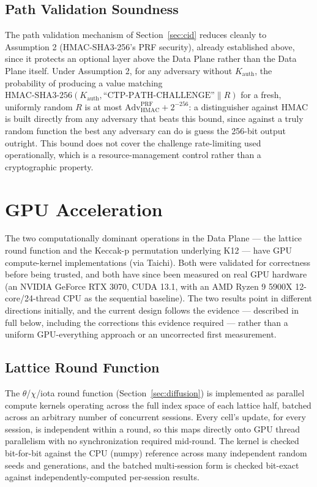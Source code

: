 \documentclass[twocolumn,10pt,journal,compsoc]{IEEEtran}
\begin{document}
\subsection{Path Validation Soundness}
The path validation mechanism of Section~\ref{sec:cid} reduces cleanly to Assumption 2 (HMAC-SHA3-256's PRF security), already established above, since it protects an optional layer above the Data Plane rather than the Data Plane itself. Under Assumption 2, for any adversary without $K_{\text{auth}}$, the probability of producing a value matching $\text{HMAC-SHA3-256}(K_{\text{auth}}, \text{``CTP-PATH-CHALLENGE''} \| R)$ for a fresh, uniformly random $R$ is at most $\text{Adv}^{\text{PRF}}_{\text{HMAC}} + 2^{-256}$: a distinguisher against HMAC is built directly from any adversary that beats this bound, since against a truly random function the best any adversary can do is guess the 256-bit output outright. This bound does not cover the challenge rate-limiting used operationally, which is a resource-management control rather than a cryptographic property.

\section{GPU Acceleration}
\label{sec:gpu}
The two computationally dominant operations in the Data Plane --- the lattice round function and the Keccak-p permutation underlying K12 --- have GPU compute-kernel implementations (via Taichi). Both were validated for correctness before being trusted, and both have since been measured on real GPU hardware (an NVIDIA GeForce RTX 3070, CUDA 13.1, with an AMD Ryzen 9 5900X 12-core/24-thread CPU as the sequential baseline). The two results point in different directions initially, and the current design follows the evidence --- described in full below, including the corrections this evidence required --- rather than a uniform GPU-everything approach or an uncorrected first measurement.

\subsection{Lattice Round Function}
The $\theta$/$\chi$/iota round function (Section~\ref{sec:diffusion}) is implemented as parallel compute kernels operating across the full index space of each lattice half, batched across an arbitrary number of concurrent sessions. Every cell's update, for every session, is independent within a round, so this maps directly onto GPU thread parallelism with no synchronization required mid-round. The kernel is checked bit-for-bit against the CPU (numpy) reference across many independent random seeds and generations, and the batched multi-session form is checked bit-exact against independently-computed per-session results.
\end{document}
